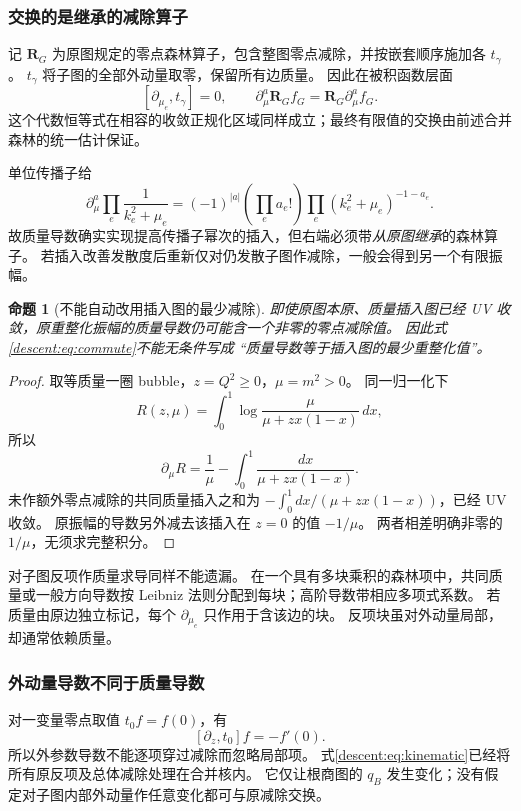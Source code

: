 \documentclass[11pt,a4paper,oneside]{ctexart}
\theoremstyle{cnplain}
\newtheorem{proposition}[theorem]{命题}
\theoremstyle{definition}
\theoremstyle{remark}
\numberwithin{equation}{section}
\begin{document}
\subsubsection{交换的是继承的减除算子}
记 $\mathbf R_G$ 为原图规定的零点森林算子，包含整图零点减除，并按嵌套顺序施加各 $t_\gamma$。
$t_\gamma$ 将子图的全部外动量取零，保留所有边质量。
因此在被积函数层面
\begin{equation}\label{descent:eq:commute}
 [\partial_{\mu_e},t_\gamma]=0,\qquad
 \partial_\mu^a\mathbf R_G f_G
                =\mathbf R_G\partial_\mu^a f_G.
\end{equation}
这个代数恒等式在相容的收敛正规化区域同样成立；最终有限值的交换由前述合并森林的统一估计保证。

单位传播子给
\begin{equation}\label{descent:eq:insert}
 \partial_\mu^a\prod_e\frac1{k_e^2+\mu_e}
 =(-1)^{|a|}\left(\prod_e a_e!\right)
              \prod_e(k_e^2+\mu_e)^{-1-a_e}.
\end{equation}
故质量导数确实实现提高传播子幂次的插入，但右端必须带\emph{从原图继承}的森林算子。
若插入改善发散度后重新仅对仍发散子图作减除，一般会得到另一个有限振幅。

\begin{proposition}[不能自动改用插入图的最少减除]\label{descent:prop:oversub}
即使原图本原、质量插入图已经 UV 收敛，原重整化振幅的质量导数仍可能含一个非零的零点减除值。
因此式\eqref{descent:eq:commute}不能无条件写成 ``质量导数等于插入图的最少重整化值''。
\end{proposition}
\begin{proof}
取等质量一圈 bubble，$z=Q^2\geq0$，$\mu=m^2>0$。
同一归一化下
\[
 R(z,\mu)=\int_0^1\log\frac{\mu}{\mu+zx(1-x)}\,dx,
\]
所以
\begin{equation}\label{descent:eq:bubble}
 \partial_\mu R
   =\frac1\mu-\int_0^1\frac{dx}{\mu+zx(1-x)}.
\end{equation}
未作额外零点减除的共同质量插入之和为
$-\int_0^1dx/(\mu+zx(1-x))$，已经 UV 收敛。
原振幅的导数另外减去该插入在 $z=0$ 的值 $-1/\mu$。
两者相差明确非零的 $1/\mu$，无须求完整积分。
\end{proof}

对子图反项作质量求导同样不能遗漏。
在一个具有多块乘积的森林项中，共同质量或一般方向导数按 Leibniz 法则分配到每块；高阶导数带相应多项式系数。
若质量由原边独立标记，每个 $\partial_{\mu_e}$ 只作用于含该边的块。
反项块虽对外动量局部，却通常依赖质量。

\subsubsection{外动量导数不同于质量导数}
对一变量零点取值 $t_0f=f(0)$，有
\begin{equation}\label{descent:eq:kincommutator}
 [\partial_z,t_0]f=-f'(0).
\end{equation}
所以外参数导数不能逐项穿过减除而忽略局部项。
式\eqref{descent:eq:kinematic}已经将所有原反项及总体减除处理在合并核内。
它仅让根商图的 $q_B$ 发生变化；没有假定对子图内部外动量作任意变化都可与原减除交换。
\end{document}
